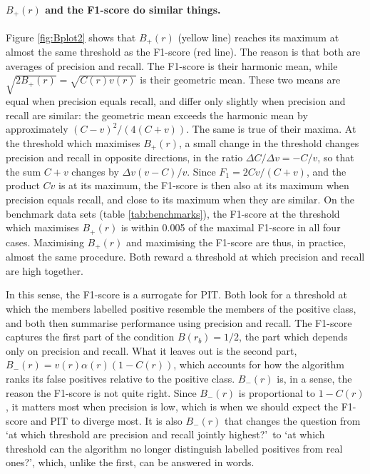 \documentclass[preprint,12pt]{article}
\begin{document}
\paragraph{$B_+(r)$ and the F1-score do similar things.} Figure \ref{fig:Bplot2} shows that $B_+(r)$ (yellow line) reaches its maximum at almost the same threshold as the F1-score (red line). The reason is that both are averages of precision and recall. The F1-score is their harmonic mean, while $\sqrt{2 B_+(r)} = \sqrt{C(r) v(r)}$ is their geometric mean. These two means are equal when precision equals recall, and differ only slightly when precision and recall are similar: the geometric mean exceeds the harmonic mean by approximately $(C-v)^2/(4(C+v))$. The same is true of their maxima. At the threshold which maximises $B_+(r)$, a small change in the threshold changes precision and recall in opposite directions, in the ratio $\Delta C / \Delta v = -C/v$, so that the sum $C+v$ changes by $\Delta v (v-C)/v$. Since $F_1 = 2Cv/(C+v)$, and the product $Cv$ is at its maximum, the F1-score is then also at its maximum when precision equals recall, and close to its maximum when they are similar. On the benchmark data sets (table \ref{tab:benchmarks}), the F1-score at the threshold which maximises $B_+(r)$ is within 0.005 of the maximal F1-score in all four cases. Maximising $B_+(r)$ and maximising the F1-score are thus, in practice, almost the same procedure. Both reward a threshold at which precision and recall are high together.

In this sense, the F1-score is a surrogate for PIT. Both look for a threshold at which the members labelled positive resemble the members of the positive class, and both then summarise performance using precision and recall. The F1-score captures the first part of the condition $B(r_b)=1/2$, the part which depends only on precision and recall. What it leaves out is the second part, $B_-(r) = v(r) \alpha(r) (1 - C(r))$, which accounts for how the algorithm ranks its false positives relative to the positive class. $B_-(r)$ is, in a sense, the reason the F1-score is not quite right. Since $B_-(r)$ is proportional to $1 - C(r)$, it matters most when precision is low, which is when we should expect the F1-score and PIT to diverge most. It is also $B_-(r)$ that changes the question from \lq at which threshold are precision and recall jointly highest?\rq\ to \lq at which threshold can the algorithm no longer distinguish labelled positives from real ones?\rq, which, unlike the first, can be answered in words.
\end{document}
